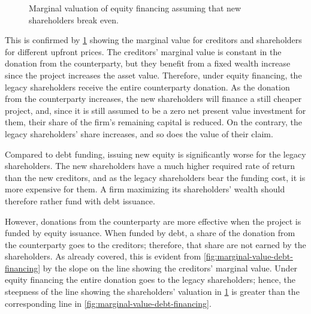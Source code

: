 \documentclass[main.tex]{subfiles}
\begin{document}
        \begin{figure}
            \centering
            \resizebox{\textwidth}{!}{%
                
            }
            \caption{
                Marginal valuation of equity financing 
                assuming that new shareholders break even.
            }
            \label{fig:marginal-value-equity-financing}
        \end{figure}

        This is confirmed by \cref{fig:marginal-value-equity-financing} showing
        the marginal value for creditors and shareholders for different upfront prices.
        The creditors' marginal value is constant in the donation from the counterparty,
        but they benefit from a fixed wealth increase since the project increases the asset value.
        Therefore, under equity financing, 
        the legacy shareholders receive the entire counterparty donation.
        As the donation from the counterparty increases,
        the new shareholders will finance a still cheaper project, 
        and, since it is still assumed to be a zero net present value investment for them, 
        their share of the firm's remaining capital is reduced.
        On the contrary, the legacy shareholders' share increases,
        and so does the value of their claim.

        Compared to debt funding, 
        issuing new equity is significantly worse for the legacy shareholders.
        The new shareholders have a much higher required rate of return than the new creditors,
        and as the legacy shareholders bear the funding cost, it is more expensive for them.
        A firm maximizing its shareholders' wealth should therefore rather fund with debt issuance.

        However, donations from the counterparty are more effective
        when the project is funded by equity issuance.
        When funded by debt, a share of the donation from the counterparty goes to the creditors;
        therefore, that share are not earned by the shareholders.
        As already covered, this is evident from \cref{fig:marginal-value-debt-financing}
        by the slope on the line showing the creditors' marginal value.
        Under equity financing the entire donation goes to the legacy shareholders;
        hence, the steepness of the line showing the shareholders' valuation in 
        \cref{fig:marginal-value-equity-financing} is greater than the corresponding line in 
        \cref{fig:marginal-value-debt-financing}.
\end{document}
